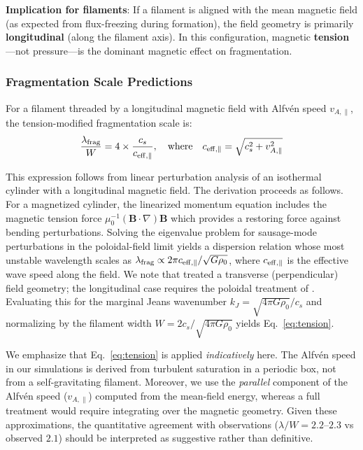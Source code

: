 \documentclass[11pt,a4paper]{article}
\begin{document}
\textbf{Implication for filaments}: If a filament is aligned with the mean magnetic field (as expected from flux-freezing during formation), the field geometry is primarily \textbf{longitudinal} (along the filament axis). In this configuration, magnetic \textbf{tension}—not pressure—is the dominant magnetic effect on fragmentation.

\subsubsection{Fragmentation Scale Predictions}

For a filament threaded by a longitudinal magnetic field with Alfv\'en speed $v_{A,\parallel}$, the tension-modified fragmentation scale is:
\begin{equation}
\frac{\lambda_{\rm frag}}{W} = 4 \times \frac{c_s}{c_{\rm eff, \parallel}}, \quad \text{where} \quad c_{\rm eff, \parallel} = \sqrt{c_s^2 + v_{A,\parallel}^2}
\label{eq:tension}
\end{equation}

This expression follows from linear perturbation analysis of an isothermal cylinder with a longitudinal magnetic field. The derivation proceeds as follows. For a magnetized cylinder, the linearized momentum equation includes the magnetic tension force $\mu_0^{-1}(\mathbf{B} \cdot \nabla)\mathbf{B}$ which provides a restoring force against bending perturbations. Solving the eigenvalue problem for sausage-mode perturbations in the poloidal-field limit \citep{Fiege2000} yields a dispersion relation whose most unstable wavelength scales as $\lambda_{\rm frag} \propto 2\pi c_{\rm eff, \parallel} / \sqrt{G\rho_0}$, where $c_{\rm eff, \parallel}$ is the effective wave speed along the field. We note that \citet{Nagasawa1987} treated a transverse (perpendicular) field geometry; the longitudinal case requires the poloidal treatment of \citet{Fiege2000}. Evaluating this for the marginal Jeans wavenumber $k_J = \sqrt{4\pi G\rho_0}/c_s$ and normalizing by the filament width $W = 2c_s/\sqrt{4\pi G\rho_0}$ yields Eq.~\ref{eq:tension}.

We emphasize that Eq.~\ref{eq:tension} is applied \textit{indicatively} here. The Alfv\'en speed in our simulations is derived from turbulent saturation in a periodic box, not from a self-gravitating filament. Moreover, we use the \textit{parallel} component of the Alfv\'en speed ($v_{A,\parallel}$) computed from the mean-field energy, whereas a full treatment would require integrating over the magnetic geometry. Given these approximations, the quantitative agreement with observations ($\lambda/W = 2.2$--$2.3$ vs observed $2.1$) should be interpreted as suggestive rather than definitive.
\end{document}
